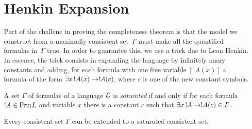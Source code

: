 \documentclass[open-logic-section]{subfiles}
\begin{document}
\section{Henkin Expansion}

\begin{wordy}
Part of the challene in proving the completeness theorem is that the
model we construct from a maximally consistent set~$\Gamma$ must make
all the quantified formulas in~$\Gamma$ true.  In order to guarantee
this, we use a trick due to Leon Henkin.  In essence, the trick
consists in expanding the language by infinitely many constants and
adding, for each formula with one free variable $[!A(x)]$ a formula of
the form $\lexists[x][!A(x)] \lif !A(c)$, where $c$ is one of the new
constant symbols.  
\end{wordy}

\begin{defn}
  A set $\Gamma$ of formulas of a language $\mathcal {L}$ is
  \emph{saturated} if and only if for each formula $!A \in
  \Frm {L}$ and variable $x$ there is a constant $c$ such that
  $\lexists[x][!A] \lif !A(c) \in \Gamma$.
\end{defn}


\begin{prop}
  Every consistent set $\Gamma$ can be extended to a saturated
  consistent set.
\end{prop}

\end{document}
